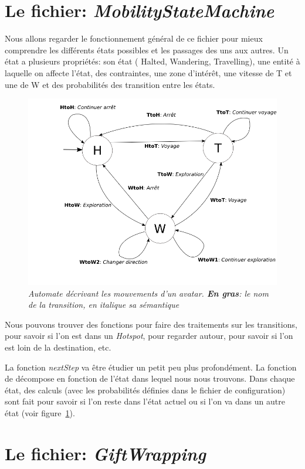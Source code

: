 \documentclass[11pt,a4paper]{article}
\begin{document}
\section{Le fichier: \textit{MobilityStateMachine}}
Nous allons regarder le fonctionnement général de ce fichier pour mieux comprendre les différents états possibles et les passages des uns aux autres. Un état a plusieurs propriétés: son état ( Halted, Wandering, Travelling), une entité à laquelle on affecte l'état, des contraintes, une zone d'intérêt, une vitesse de T et une de W et des probabilités des transition entre les états. 
\begin{figure}[h!]
  \begin{center}
    \includegraphics[scale=0.35]{images/automate.png} 
    \caption{\textit{\small Automate décrivant les mouvements d'un
        avatar. \textbf{En gras}: le nom de la transition, en \textit{italique} sa sémantique}}
    \label{fig:automate}
  \end{center}
\end{figure}
\par Nous pouvons trouver des fonctions pour faire des traitements sur les transitions, pour savoir si l'on est dans un \textit{Hotspot}, pour regarder autour, pour savoir si l'on est loin de la destination, etc. 
\par La fonction \textit{nextStep} va être étudier un petit peu plus profondément. La fonction de décompose en fonction de l'état dans lequel nous nous trouvons. Dans chaque état, des calculs (avec les probabilités définies dans le fichier de configuration) sont fait pour savoir si l'on reste dans l'état actuel ou si l'on va dans un autre état (voir figure~\ref{fig:automate}).

\section{Le fichier: \textit{GiftWrapping}}


\newpage




 
\end{document}
